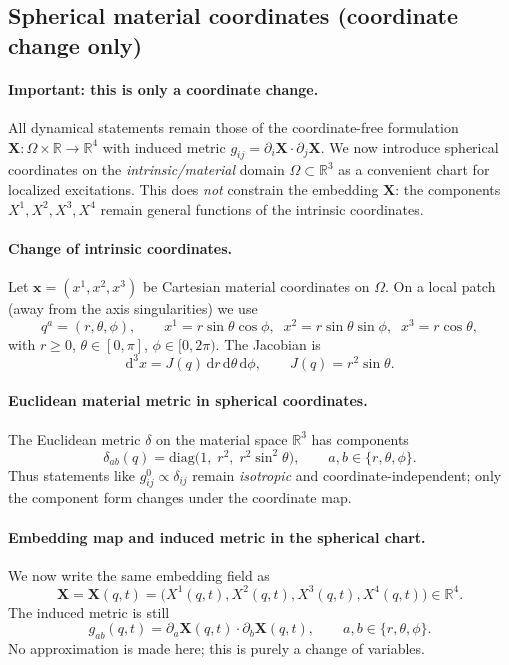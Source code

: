 \documentclass[11pt,a4paper]{article}
\newcommand{\R}{\mathbb{R}}
\providecommand{\dd}{\mathrm{d}}
\newcommand{\X}{\mathbf{X}}                 %
\newcommand{\x}{\mathbf{x}}                 %
\begin{document}
\subsection{Spherical material coordinates (coordinate change only)}
\label{subsec:spherical_material_coords}

\paragraph{Important: this is only a coordinate change.}
All dynamical statements remain those of the coordinate-free formulation
\(\X:\Omega\times\R\to\R^4\) with induced metric \(g_{ij}=\partial_i\X\cdot\partial_j\X\).
We now introduce spherical coordinates on the \emph{intrinsic/material} domain
\(\Omega\subset\R^3\) as a convenient chart for localized excitations.
This does \emph{not} constrain the embedding \(\X\): the components \(X^1,X^2,X^3,X^4\)
remain general functions of the intrinsic coordinates.

\paragraph{Change of intrinsic coordinates.}
Let \(\x=(x^1,x^2,x^3)\) be Cartesian material coordinates on \(\Omega\).
On a local patch (away from the axis singularities) we use
\[
q^a=(r,\theta,\phi),\qquad
x^1=r\sin\theta\cos\phi,\;\;
x^2=r\sin\theta\sin\phi,\;\;
x^3=r\cos\theta,
\]
with \(r\ge 0\), \(\theta\in[0,\pi]\), \(\phi\in[0,2\pi)\).
The Jacobian is
\[
\dd^3x = J(q)\,\dd r\,\dd\theta\,\dd\phi,
\qquad
J(q)=r^2\sin\theta.
\]

\paragraph{Euclidean material metric in spherical coordinates.}
The Euclidean metric \(\delta\) on the material space \(\R^3\) has components
\[
\delta_{ab}(q)=\mathrm{diag}\!\big(1,\; r^2,\; r^2\sin^2\theta\big),
\qquad a,b\in\{r,\theta,\phi\}.
\]
Thus statements like \(g^0_{ij}\propto \delta_{ij}\) remain \emph{isotropic} and
coordinate-independent; only the component form changes under the coordinate map.

\paragraph{Embedding map and induced metric in the spherical chart.}
We now write the same embedding field as
\[
\X=\X(q,t)=\big(X^1(q,t),X^2(q,t),X^3(q,t),X^4(q,t)\big)\in\R^4.
\]
The induced metric is still
\[
g_{ab}(q,t)=\partial_a\X(q,t)\cdot\partial_b\X(q,t),
\qquad a,b\in\{r,\theta,\phi\}.
\]
No approximation is made here; this is purely a change of variables.
\end{document}
